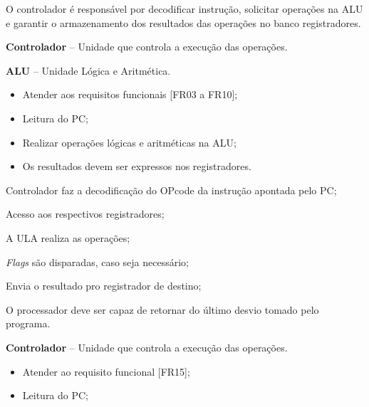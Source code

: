 \documentclass{article}
\begin{document}
  O controlador é responsável por decodificar instrução, solicitar operações na ALU e garantir o armazenamento dos resultados das operações no banco registradores.
  
  \actors
    \begin{description}
     \item \textbf{Controlador} – Unidade que controla a execução das operações.
     \item \textbf{ALU} – Unidade L\'{o}gica e Aritm\'{e}tica.
    \end{description}
    
  \preconditions 
    \begin{itemize}
     \item Atender aos requisitos funcionais [FR03 a FR10];
     \item Leitura do PC;
     \item Realizar operações lógicas e aritméticas na ALU;
    \end{itemize}

  \postconditions
    \begin{itemize}
     \item Os resultados devem ser expressos nos registradores.
    \end{itemize}
  
  
  \begin{mainflow}
    \item  Controlador faz a  decodificação do OPcode da instrução apontada pelo PC;
    \item Acesso aos respectivos registradores;
    \item A ULA realiza as operações;
    \item \textit{Flags} são disparadas, caso seja necessário;
    \item Envia o resultado pro registrador de destino;
  \end{mainflow}
  
  O processador deve ser capaz de retornar do último desvio tomado pelo programa.
  \actors
  \begin{description}
  	\item \textbf{Controlador} – Unidade que controla a execução das operações.
  \end{description}
  
  \preconditions 
  \begin{itemize}
  	\item Atender ao requisito funcional [FR15];
  	\item Leitura do PC;
  \end{itemize}
  
\end{document}
